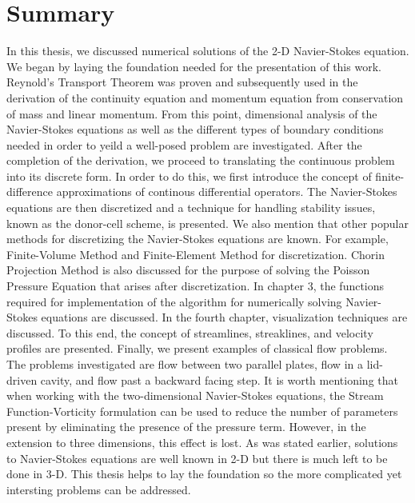 %
%

\chapter{Summary}

In this thesis, we discussed numerical solutions of the 2-D Navier-Stokes equation. We began by laying the foundation needed for the presentation of this work. Reynold's Transport Theorem was proven and subsequently used in the derivation of the continuity equation and momentum equation from conservation of mass and linear momentum. From this point, dimensional analysis of the Navier-Stokes equations as well as the different types of boundary conditions needed in order to yeild a well-posed problem are investigated. After the completion of the derivation, we proceed to translating the continuous problem into its discrete form. In order to do this, we first introduce the concept of finite-difference approximations of continous differential operators. The Navier-Stokes equations are then discretized and a technique for handling stability issues, known as the donor-cell scheme, is presented. We also mention that other popular methods for discretizing the Navier-Stokes equations are known. For example, Finite-Volume Method and Finite-Element Method for discretization. Chorin Projection Method is also discussed for the purpose of solving the Poisson Pressure Equation that arises after discretization. In chapter 3, the functions required for implementation of the algorithm for numerically solving Navier-Stokes equations are discussed. In the fourth chapter, visualization techniques are discussed. To this end, the concept of streamlines, streaklines, and velocity profiles are presented. Finally, we present examples of classical flow problems. The problems investigated are flow between two parallel plates, flow in a lid-driven cavity, and flow past a backward facing step. It is worth mentioning that when working with the two-dimensional Navier-Stokes equations, the Stream Function-Vorticity formulation can be used to reduce the number of parameters present by eliminating the presence of the pressure term. However, in the extension to three dimensions, this effect is lost. As was stated earlier, solutions to Navier-Stokes equations are well known in 2-D but there is much left to be done in 3-D. This thesis helps to lay the foundation so the more complicated yet intersting problems can be addressed. 

%